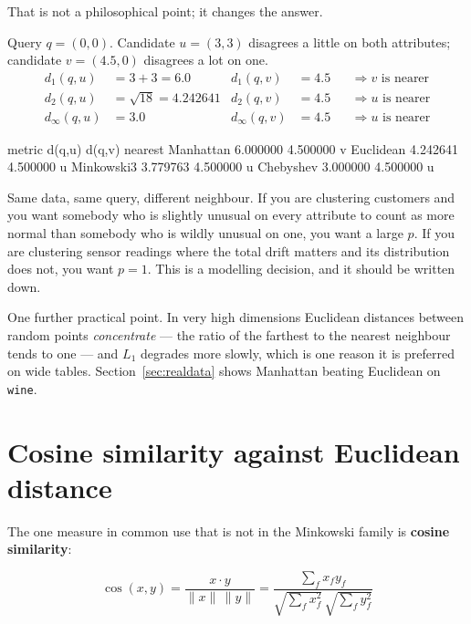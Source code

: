 \documentclass[11pt]{article}
\begin{document}
That is not a philosophical point; it changes the answer.

\begin{worked}
Query $q = (0,0)$. Candidate $u = (3,3)$ disagrees a little on both
attributes; candidate $v = (4.5, 0)$ disagrees a lot on one.
\begin{align*}
  d_1(q,u) &= 3+3 = 6.0 & d_1(q,v) &= 4.5 & &\Rightarrow v \text{ is nearer}\\
  d_2(q,u) &= \sqrt{18} = 4.242641 & d_2(q,v) &= 4.5 & &\Rightarrow u
    \text{ is nearer}\\
  d_\infty(q,u) &= 3.0 & d_\infty(q,v) &= 4.5 & &\Rightarrow u \text{ is
    nearer}
\end{align*}
\end{worked}

\begin{codeout}
metric           d(q,u)     d(q,v)   nearest
Manhattan      6.000000   4.500000   v
Euclidean      4.242641   4.500000   u
Minkowski3     3.779763   4.500000   u
Chebyshev      3.000000   4.500000   u
\end{codeout}

Same data, same query, different neighbour. If you are clustering customers
and you want somebody who is slightly unusual on every attribute to count as
more normal than somebody who is wildly unusual on one, you want a large $p$.
If you are clustering sensor readings where the total drift matters and its
distribution does not, you want $p=1$. This is a modelling decision, and it
should be written down.

One further practical point. In very high dimensions Euclidean distances
between random points \emph{concentrate} --- the ratio of the farthest to
the nearest neighbour tends to one --- and $L_1$ degrades more slowly, which
is one reason it is preferred on wide tables. Section~\ref{sec:realdata}
shows Manhattan beating Euclidean on \texttt{wine}.

\section{Cosine similarity against Euclidean distance}
\label{sec:cosine}

The one measure in common use that is not in the Minkowski family is
\textbf{cosine similarity}:

\begin{equation}
  \cos(x,y) = \frac{x \cdot y}{\|x\|\,\|y\|}
  = \frac{\sum_f x_f y_f}{\sqrt{\sum_f x_f^2}\,\sqrt{\sum_f y_f^2}}
  \label{eq:cos}
\end{equation}
\end{document}
